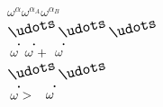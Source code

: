 \begin{spacing}{0.9}
\begin{flushleft}
	\def\uudots{\ensuremath{\scalebox{1.2}{\rotatebox{13}{$\udots$}}}}
	\def\oomega{\ensuremath{\stackrel{\mbox{\hspace{7pt}\scalebox{1.3}{$\cdot$}}}{\omega}}}
	\hspace{143pt}
	\hspace{31pt}$\omega^\alpha$\hspace{57.5pt}$\omega^{\alpha_A}$\hspace{31pt}$\omega^{\alpha_B}$ \\
	\hspace{143pt}
	\hspace{23pt}$\uudots$\hspace{59.5pt}$\uudots$\hspace{37.5pt}$\uudots$ \\
	\hspace{143pt}
	\hspace{15pt}$\oomega$\hspace{61pt}$\oomega$\hspace{26pt}$+\hspace{2pt}\oomega$ \\
	\hspace{143pt}
	\hspace{7pt}$\uudots$\hspace{59.5pt}$\uudots$ \\
	\hspace{142pt}
	$\oomega$\hspace{45pt}$>\hspace{9pt}\oomega$ \\
\end{flushleft}
\end{spacing}